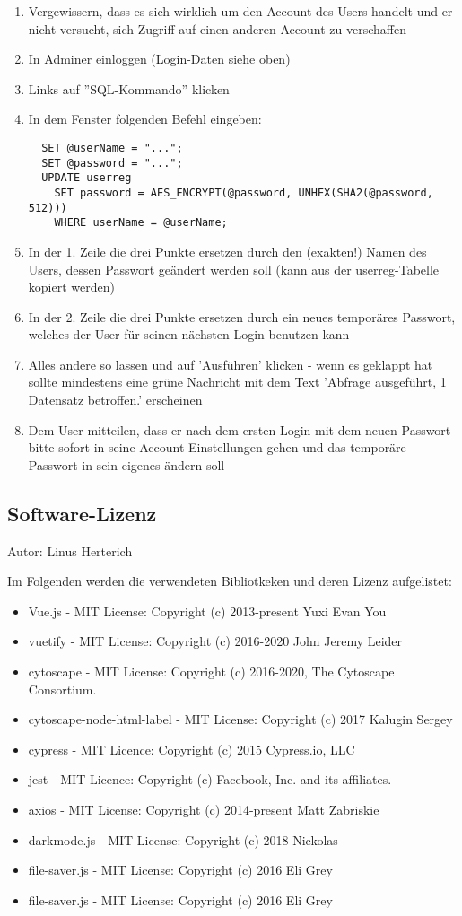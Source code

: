 \documentclass[twoside]{report}
\begin{document}
\begin{enumerate}
  \item Vergewissern, dass es sich wirklich um den Account des Users handelt und er nicht versucht, sich Zugriff auf einen anderen Account zu verschaffen
  \item In Adminer einloggen (Login-Daten siehe oben)
  \item Links auf ''SQL-Kommando'' klicken
  \item In dem Fenster folgenden Befehl eingeben:
           \begin{verbatim}
  SET @userName = "...";
  SET @password = "...";
  UPDATE userreg
    SET password = AES_ENCRYPT(@password, UNHEX(SHA2(@password, 512)))
    WHERE userName = @userName;
           \end{verbatim}
  \item In der 1. Zeile die drei Punkte ersetzen durch den (exakten!) Namen des Users, dessen Passwort geändert werden soll (kann aus der userreg-Tabelle kopiert werden)
  \item In der 2. Zeile die drei Punkte ersetzen durch ein neues temporäres Passwort, welches der User für seinen nächsten Login benutzen kann
  \item Alles andere so lassen und auf 'Ausführen' klicken - wenn es geklappt hat sollte mindestens eine grüne Nachricht mit dem Text 'Abfrage ausgeführt, 1 Datensatz betroffen.' erscheinen
  \item Dem User mitteilen, dass er nach dem ersten Login mit dem neuen Passwort bitte sofort in seine Account-Einstellungen gehen und das temporäre Passwort in sein eigenes ändern soll
\end{enumerate}

\subsection{Software-Lizenz}
{\small Autor: Linus Herterich}

Im Folgenden werden die verwendeten Bibliotkeken und deren Lizenz aufgelistet:
\begin{itemize}
  \item Vue.js - MIT License: Copyright (c) 2013-present Yuxi Evan You
  \item vuetify - MIT License: Copyright (c) 2016-2020 John Jeremy Leider
  \item cytoscape - MIT License: Copyright (c) 2016-2020, The Cytoscape Consortium.
  \item cytoscape-node-html-label - MIT License: Copyright (c) 2017 Kalugin Sergey
  \item cypress - MIT Licence: Copyright (c) 2015 Cypress.io, LLC
  \item jest - MIT Licence: Copyright (c) Facebook, Inc. and its affiliates.
  \item axios - MIT License: Copyright (c) 2014-present Matt Zabriskie
  \item darkmode.js - MIT License: Copyright (c) 2018 Nickolas
  \item file-saver.js - MIT License: Copyright (c) 2016 Eli Grey
  \item file-saver.js - MIT License: Copyright (c) 2016 Eli Grey
\end{itemize}
\end{document}
